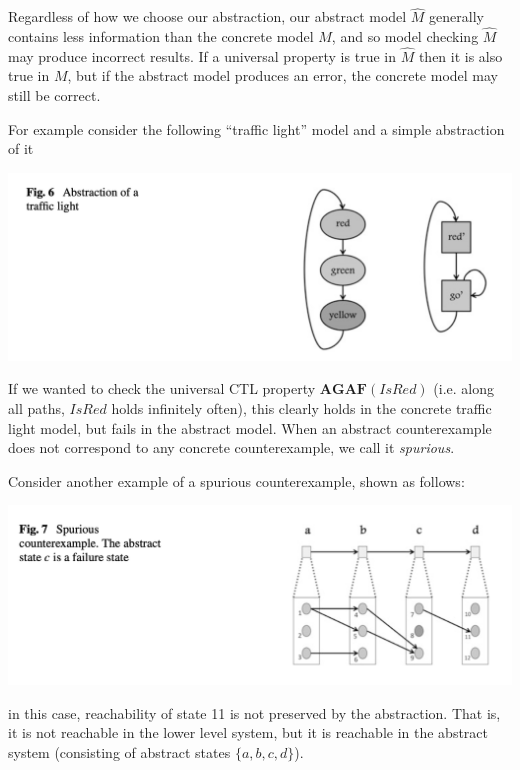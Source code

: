 \documentclass[10pt,a4paper]{article}
\begin{document}
Regardless of how we choose our abstraction, our abstract model $\widehat{M}$ generally contains less information than the concrete model $M$, and so model checking $\widehat{M}$ may produce incorrect results. If a universal property is true in $\widehat{M}$ then it is also true in $M$, but if the abstract model produces an error, the concrete model may still be correct.

For example consider the following ``traffic light'' model and a simple abstraction of it
\begin{center}
    \includegraphics[scale=0.35]{diagrams/cegar1.png}
\end{center}
If we wanted to check the universal CTL property $\textbf{AGAF}(IsRed)$ (i.e. along all paths, $IsRed$ holds infinitely often), this clearly holds in the concrete traffic light model, but fails in the abstract model. When an abstract counterexample does not correspond to any concrete counterexample, we call it \textit{spurious}.

Consider another example of a spurious counterexample, shown as follows:
\begin{center}
    \includegraphics[scale=0.40]{diagrams/cegar2.png}
\end{center}
in this case, reachability of state 11 is not preserved by the abstraction. That is, it is not reachable in the lower level system, but it is reachable in the abstract system (consisting of abstract states $\{a,b,c,d\}$).
\end{document}
